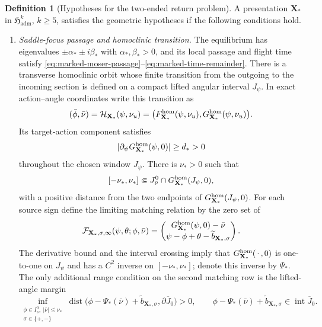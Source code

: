 \documentclass[11pt]{amsart}
\numberwithin{equation}{section}
\theoremstyle{definition}
\newtheorem{definition}[theorem]{Definition}
\theoremstyle{remark}
\newcommand{\dist}{\operatorname {dist}}
\begin{document}
\begin{definition}[Hypotheses for the two-ended return problem]
\label{def:two-ended-hypotheses}
A presentation $\mathbf X_*$ in
$\mathfrak H_{\mathrm{adm}}^k$, $k\ge5$, satisfies the geometric
hypotheses if the following conditions hold.
\begin{enumerate}
\renewcommand{\labelenumi}{\textup{(H\arabic{enumi})}}
\item \emph{Saddle-focus passage and homoclinic transition.}
The equilibrium has eigenvalues
$\pm\alpha_*\pm i\beta_*$ with $\alpha_*,\beta_*>0$, and its local
passage and flight time satisfy
\eqref{eq:marked-moser-passage}--\eqref{eq:marked-time-remainder}.
There is a transverse homoclinic orbit whose finite transition from the
outgoing to the incoming section is defined on a compact lifted angular
interval $J_\psi$.
In exact action--angle coordinates write this transition as
\begin{equation}\label{eq:abstract-finite-homoclinic-map}
 (\bar\phi,\bar\nu)
 =\mathcal H_{\mathbf X_*}(\psi,\nu_u)
 =\bigl(F^{\rm hom}_{\mathbf X_*}(\psi,\nu_u),
        G^{\rm hom}_{\mathbf X_*}(\psi,\nu_u)\bigr).
\end{equation}
Its target-action component satisfies
\begin{equation}\label{eq:abstract-homoclinic-margin}
 |\partial_\psi G^{\rm hom}_{\mathbf X_*}(\psi,0)|\ge d_*>0
\end{equation}
throughout the chosen window $J_\psi$.  There is $\nu_*>0$ such that
\begin{equation}\label{eq:abstract-target-crossing}
 [-\nu_*,\nu_*]\Subset
 J_{\bar\nu}^0\cap G^{\rm hom}_{\mathbf X_*}(J_\psi,0),
\end{equation}
with a positive distance from the two endpoints of
$G^{\rm hom}_{\mathbf X_*}(J_\psi,0)$.  For each source sign define the limiting
matching relation by the zero set of
\begin{equation}\label{eq:abstract-limiting-matching-relation}
 \mathcal F_{\mathbf X_*,\sigma,\infty}
       (\psi,\theta;\phi,\bar\nu)
 =\begin{pmatrix}
   G^{\rm hom}_{\mathbf X_*}(\psi,0)-\bar\nu\\
   \psi-\phi+\theta-\widetilde b_{\mathbf X_*,\sigma}
  \end{pmatrix}.
\end{equation}
The derivative bound and the interval crossing imply that
$G^{\rm hom}_{\mathbf X_*}(\,\cdot\,,0)$ is one-to-one on $J_\psi$ and
has a $C^2$ inverse on $[-\nu_*,\nu_*]$; denote this inverse by
$\Psi_*$.  The only additional range condition on the second matching row
is the lifted-angle margin
\begin{equation}\label{eq:abstract-angular-lift-margin}
 \inf_{\substack{\phi\in I_s^0,\ |\bar\nu|\le\nu_*\\
                  \sigma\in\{+,-\}}}
 \dist\bigl(\phi-\Psi_*(\bar\nu)
       +\widetilde b_{\mathbf X_*,\sigma},\partial\overline J_0\bigr)>0,
 \qquad
 \phi-\Psi_*(\bar\nu)+\widetilde b_{\mathbf X_*,\sigma}
 \in\operatorname{int}\overline J_0.
\end{equation}


\end{enumerate}
\end{definition}
\end{document}
